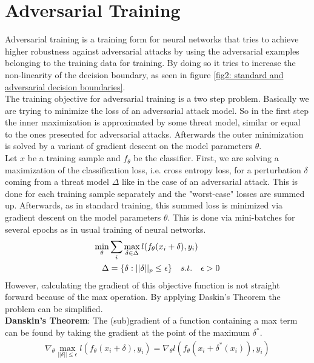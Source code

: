 \documentclass{article}
\begin{document}
\section{Adversarial Training}
  
Adversarial training is a training form for neural networks that tries to achieve higher robustness against adversarial attacks by using the adversarial examples belonging to the training data for training. By doing so it tries to increase the non-linearity of the decision boundary, as seen in figure \ref{fig2: standard and adversarial decision boundaries}. \\
The training objective for adversarial training is a two step problem. Basically we are trying to minimize the loss of an adversarial attack model. So in the first step the inner maximization is approximated by some threat model, similar or equal to the ones presented for adversarial attacks. Afterwards the outer minimization is solved by a variant of gradient descent on the model parameters $\theta$. \\
Let $x$ be a training sample and $f_{\theta}$ be the classifier. First, we are solving a maximization of the classification loss, i.e. cross entropy loss, for a perturbation $\delta$ coming from a threat model $\Delta$ like in the case of an adversarial attack. This is done for each training sample separately and the "worst-case" losses are summed up. Afterwards, as in standard training, this summed loss is minimized via gradient descent on the model parameters $\theta$. This is done via mini-batches for several epochs as in usual training of neural networks.
\vspace{-0.2cm}
\begin{align}
  \label{eqn:saddle}
  \min_{\theta} & \sum_i \max_{\delta \in \Delta} \space l(f_{\theta}(x_i + \delta), y_i)  \\
  \Delta & = \{\delta : ||\delta||_p \leq \epsilon\} \quad s.t. \quad \epsilon > 0
\end{align}
However, calculating the gradient of this objective function is not straight forward because of the max operation. By applying Daskin's Theorem the problem can be simplified. \\
\textbf{Danskin's Theorem}: The (sub)gradient of a function containing a max term can be found by taking the gradient at the point of the maximum $\delta^{*}$.
\begin{align*}
  \nabla_{\theta} \max_{||\delta|| \leq \epsilon} l(f_{\theta}(x_i + \delta), y_i) = \nabla_{\theta} l(f_{\theta}(x_i + \delta^{*}(x_i)), y_i)
\end{align*}
\end{document}
